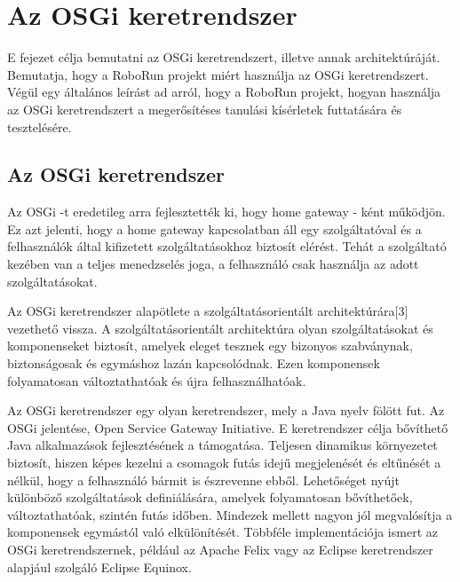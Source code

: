 \chapter{Az OSGi keretrendszer}\label{ch:MAT}

\begin{osszefoglal}
	E fejezet célja bemutatni az OSGi keretrendszert, illetve annak architektúráját. Bemutatja, hogy a RoboRun projekt miért használja az OSGi keretrendszert. Végül egy általános leírást ad arról, hogy a RoboRun projekt, hogyan használja az OSGi keretrendszert a megerősítéses tanulási kísérletek futtatására és tesztelésére.
\end{osszefoglal}


\section{Az OSGi keretrendszer}\label{sec:MAT:bev}
Az OSGi -t eredetileg arra fejlesztették ki, hogy home gateway - ként működjön. Ez azt jelenti, hogy a home gateway kapcsolatban áll egy szolgáltatóval és a felhasználók által kifizetett szolgáltatásokhoz biztosít elérést. Tehát a szolgáltató kezében  van a teljes menedzselés joga, a felhasználó csak használja az adott szolgáltatásokat. 
	
Az OSGi keretrendszer alapötlete a szolgáltatásorientált architektúrára[3] vezethető vissza. A szolgáltatásorientált architektúra olyan szolgáltatásokat és komponenseket biztosít, amelyek eleget tesznek egy bizonyos szabványnak, biztonságosak és egymáshoz lazán kapcsolódnak. Ezen komponensek folyamatosan változtathatóak és újra felhasználhatóak.

Az OSGi keretrendszer egy olyan keretrendszer, mely a Java nyelv fölött fut. Az OSGi jelentése, Open Service Gateway Initiative. E keretrendszer célja bővíthető Java alkalmazások fejlesztésének a támogatása. Teljesen dinamikus környezetet biztosít, hiszen képes kezelni a csomagok futás idejű megjelenését és eltűnését a nélkül, hogy a felhasználó bármit is észrevenne ebből. Lehetőséget nyújt különböző szolgáltatások definiálására, amelyek folyamatosan bővíthetőek, változtathatóak, szintén futás időben. Mindezek mellett nagyon jól megvalósítja a komponensek egymástól való elkülönítését. Többféle implementációja ismert az OSGi keretrendszernek, például az Apache Felix vagy az Eclipse keretrendszer alapjául szolgáló Eclipse Equinox.
	   

